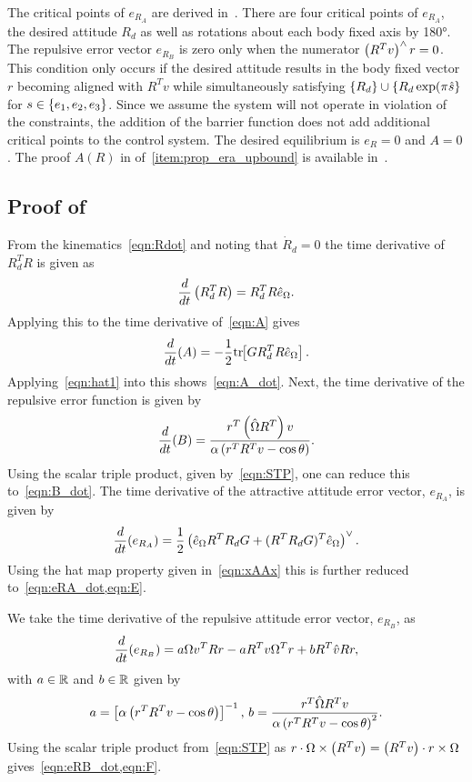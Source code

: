 \documentclass[letterpaper, 10 pt, conference]{ieeeconf}  %
\begin{document}
The critical points of \( e_{R_A} \) are derived in~\cite{bullo2004}.
There are four critical points of \( e_{R_A} \), the desired attitude \( R_d \) as well as rotations about each body fixed axis by \ang{180}.
The repulsive error vector \( e_{R_{B}} \) is zero only when the numerator \( \left( R^T v \right)^\wedge r = 0 \). 
This condition only occurs if the desired attitude results in the body fixed vector \( r \) becoming aligned with \(R^T v \) while simultaneously satisfying \(\left\{ R_d \right\} \cup \left\{ R_d \exp(\pi \hat{s} \right\} \) for \( s \in \left\{ e_1, e_2, e_3 \right\} \).
Since we assume the system will not operate in violation of the constraints, the addition of the barrier function does not add additional critical points to the control system.
The desired equilibrium is \( e_R = 0 \) and \( A = 0\).
The proof \( A(R) \) in of~\cref{item:prop_era_upbound} is available in~\cite{LeeITCST13}.
\subsection{Proof of~}\label{proof:error_dyn}
From the kinematics~\cref{eqn:Rdot} and noting that \( \dot{R}_d = 0 \) the time derivative of \( R_d^T R \) is given as
\begin{gather*}
	\frac{d }{d t} \left( R_d^T R \right) = R_d^T R \hat{e}_\Omega .
\end{gather*}
Applying this to the time derivative of~\cref{eqn:A} gives
\begin{gather*}
	\frac{d }{d t} (A) = -\frac{1}{2} \mathrm{tr}\negthickspace\left[ G R_d^T R \hat{e}_\Omega \right] .
\end{gather*}
Applying~\cref{eqn:hat1} into this shows~\cref{eqn:A_dot}.
Next, the time derivative of the repulsive error function is given by
\begin{gather*}
	\frac{d }{d t} (B) = \frac{r^T \left( \hat{\Omega} R^T \right) v}{\alpha \left( r^T R^T v - \cos \theta \right)} .
\end{gather*}
Using the scalar triple product, given by~\cref{eqn:STP}, one can reduce this to~\cref{eqn:B_dot}.
The time derivative of the attractive attitude error vector, \( e_{R_A} \), is given by
\begin{gather*}
	\frac{d }{d t} ( e_{R_A}) = \frac{1}{2} \left( \hat{e}_\Omega R^T R_d G + (R^T R_d G)^T \hat{e}_\Omega \right)^\vee .
\end{gather*}
Using the hat map property given in~\cref{eqn:xAAx} this is further reduced to~\cref{eqn:eRA_dot,eqn:E}.

We take the time derivative of the repulsive attitude error vector, \( e_{R_B} \), as
\begin{gather*}
	\frac{d }{d t}( e_{R_B} )= a \Omega v^T R r - a R^T v \Omega^T r + b R^T \hat{v} R r ,
\end{gather*}
with \( a \in \mathbb{R} \) and \( b \in \mathbb{R}\) given by 
\begin{gather*}
	a = \left[ \alpha \left( r^T R^T v - \cos \theta \right) \right]^{-1} , \,
	b = \frac{r^T \hat{\Omega} R^T v}{\alpha \left( r^T R^T v - \cos \theta \right)^2} .
\end{gather*}
Using the scalar triple product from~\cref{eqn:STP} as \( r \cdot \Omega \times \left( R^T v \right) = \left( R^T v \right) \cdot r \times \Omega \) gives~\cref{eqn:eRB_dot,eqn:F}.
\end{document}

